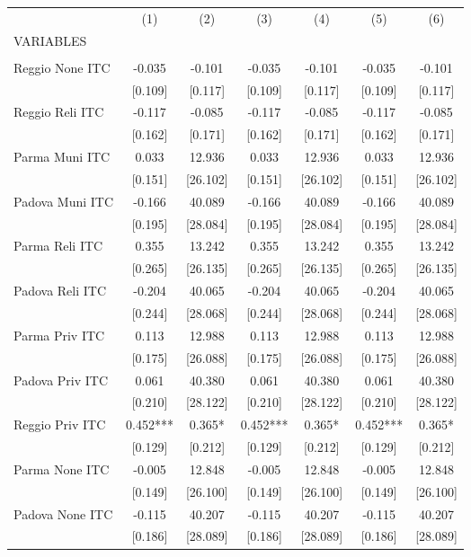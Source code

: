 \begin{tabular}{lcccccc} \hline
 & (1) & (2) & (3) & (4) & (5) & (6) \\
VARIABLES &  &  &  &  &  &  \\ \hline
 &  &  &  &  &  &  \\
Reggio None ITC & -0.035 & -0.101 & -0.035 & -0.101 & -0.035 & -0.101 \\
 & [0.109] & [0.117] & [0.109] & [0.117] & [0.109] & [0.117] \\
Reggio Reli ITC & -0.117 & -0.085 & -0.117 & -0.085 & -0.117 & -0.085 \\
 & [0.162] & [0.171] & [0.162] & [0.171] & [0.162] & [0.171] \\
Parma Muni ITC & 0.033 & 12.936 & 0.033 & 12.936 & 0.033 & 12.936 \\
 & [0.151] & [26.102] & [0.151] & [26.102] & [0.151] & [26.102] \\
Padova Muni ITC & -0.166 & 40.089 & -0.166 & 40.089 & -0.166 & 40.089 \\
 & [0.195] & [28.084] & [0.195] & [28.084] & [0.195] & [28.084] \\
Parma Reli ITC & 0.355 & 13.242 & 0.355 & 13.242 & 0.355 & 13.242 \\
 & [0.265] & [26.135] & [0.265] & [26.135] & [0.265] & [26.135] \\
Padova Reli ITC & -0.204 & 40.065 & -0.204 & 40.065 & -0.204 & 40.065 \\
 & [0.244] & [28.068] & [0.244] & [28.068] & [0.244] & [28.068] \\
Parma Priv ITC & 0.113 & 12.988 & 0.113 & 12.988 & 0.113 & 12.988 \\
 & [0.175] & [26.088] & [0.175] & [26.088] & [0.175] & [26.088] \\
Padova Priv ITC & 0.061 & 40.380 & 0.061 & 40.380 & 0.061 & 40.380 \\
 & [0.210] & [28.122] & [0.210] & [28.122] & [0.210] & [28.122] \\
Reggio Priv ITC & 0.452*** & 0.365* & 0.452*** & 0.365* & 0.452*** & 0.365* \\
 & [0.129] & [0.212] & [0.129] & [0.212] & [0.129] & [0.212] \\
Parma None ITC & -0.005 & 12.848 & -0.005 & 12.848 & -0.005 & 12.848 \\
 & [0.149] & [26.100] & [0.149] & [26.100] & [0.149] & [26.100] \\
Padova None ITC & -0.115 & 40.207 & -0.115 & 40.207 & -0.115 & 40.207 \\
 & [0.186] & [28.089] & [0.186] & [28.089] & [0.186] & [28.089] \\

\end{tabular}
